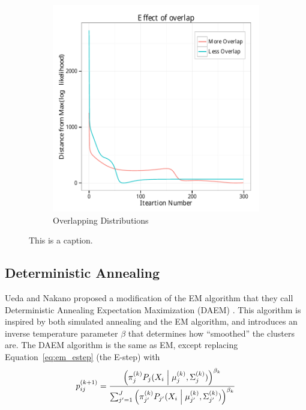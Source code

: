\documentclass{article}
\newcommand*{\cond}{\;\ifnum\currentgrouptype=16 \middle\fi|\;}
\theoremstyle{definition}
\theoremstyle{algodesc}
\begin{document}
\begin{figure}[htb]
\begin{subfigure}[t]{.49\linewidth}
    \includegraphics[width=\linewidth]{include/overlap.pdf}
    \caption{Overlapping Distributions} \label{fig:em_struggles_overlap}
  \end{subfigure}
  \caption{This is a caption.}
  \label{fig:em_struggles}
\end{figure}


\subsection{Deterministic Annealing}

Ueda and Nakano proposed a modification of the EM algorithm that they call Deterministic Annealing Expectation Maximization (DAEM) \cite{uedanakano98}. This algorithm is inspired by both simulated annealing and the EM algorithm, and introduces an inverse temperature parameter $\beta$ that determines how ``smoothed'' the clusters are. The DAEM algorithm is the same as EM, except replacing Equation~\ref{eq:em_estep} (the E-step) with
  \begin{equation} \label{eq:da_estep}
  p_{ij}^{(k+1)}
    = \frac{\left( \pi_j^{(k)} P_j(X_i \cond \mu_j^{(k)}, \Sigma_j^{(k)}) \right)^{\beta_k}}{\sum_{j'=1}^J \left( \pi_{j'}^{(k)} P_{j'}(X_i \cond \mu_{j'}^{(k)}, \Sigma_{j'}^{(k)}) \right)^{\beta_k}}
  \end{equation}
\end{document}
